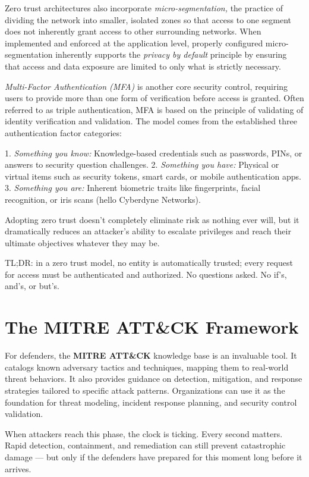 Zero trust architectures also incorporate \textit{micro-segmentation,} the practice of dividing the network into smaller, isolated zones so that access to one segment does not inherently grant access to other surrounding networks. When implemented and enforced at the application level, properly configured micro-segmentation inherently supports the \textit{privacy by default} principle by ensuring that access and data exposure are limited to only what is strictly necessary.

\textit{Multi-Factor Authentication (MFA)} is another core security control, requiring users to provide more than one form of verification before access is granted. Often referred to as triple authentication, MFA is based on the principle of validating of identity verification and validation. The model comes from the established three authentication factor categories:

1. \textit{Something you know:} Knowledge-based credentials such as passwords, PINs, or answers to security question challenges.
2. \textit{Something you have:} Physical or virtual items such as security tokens, smart cards, or mobile authentication apps.
3. \textit{Something you are:} Inherent biometric traits like fingerprints, facial recognition, or iris scans (hello Cyberdyne Networks).

Adopting zero trust doesn't completely eliminate risk as nothing ever will, but it dramatically reduces an attacker's ability to escalate privileges and reach their ultimate objectives whatever they may be.

TL;DR: in a zero trust model, no entity is automatically trusted; every request for access must be authenticated and authorized. No questions asked. No if's, and's, or but's.

\section{The MITRE ATT\&CK Framework}
For defenders, the \textbf{MITRE ATT\&CK} knowledge base is an invaluable tool. It catalogs known adversary tactics and techniques, mapping them to real-world threat behaviors. It also provides guidance on detection, mitigation, and response strategies tailored to specific attack patterns. Organizations can use it as the foundation for threat modeling, incident response planning, and security control validation.

When attackers reach this phase, the clock is ticking. Every second matters. Rapid detection, containment, and remediation can still prevent catastrophic damage — but only if the defenders have prepared for this moment long before it arrives.




